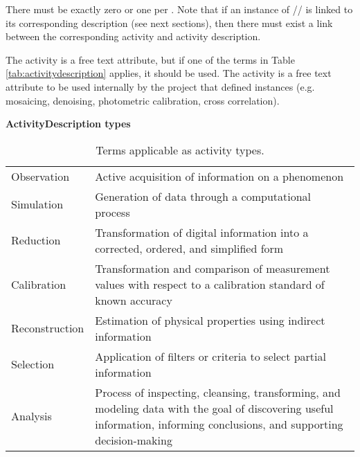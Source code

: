 There must be exactly zero or one  per . 
Note that if an instance of // is linked to its corresponding description (see next sections), then there must exist a link between the corresponding activity and activity description.

The activity  is a free text attribute, but if one of the terms in Table \ref{tab:activitydescription} applies, it should be used.
The activity  is a free text attribute to be used internally by the project that defined  instances (e.g. mosaicing, denoising, photometric calibration, cross correlation).




\begin{table}[ht]
\small
{}\textwidth
\textbf{\normalsize ActivityDescription types}\vspace{0.25em}\\
\begin{tabulary}{1.0\textwidth}{lL}
\toprule
{} &  \\
\midrule
Observation    & Active acquisition of information on a phenomenon\\
Simulation     & Generation of data through a computational process\\
Reduction      & Transformation of digital information into a corrected, ordered, and simplified form\\
Calibration    & Transformation and comparison of measurement values with respect to a calibration standard of known accuracy\\
Reconstruction & Estimation of physical properties using indirect information\\
Selection      & Application of filters or criteria to select partial information\\
Analysis       & Process of inspecting, cleansing, transforming, and modeling data with the goal of discovering useful information, informing conclusions, and supporting decision-making\\
\bottomrule
\end{tabulary}
\caption[Terms applicable as activity types.]{Terms applicable as activity types.}
\label{tab:activitydescription-roles}
\end{table}





